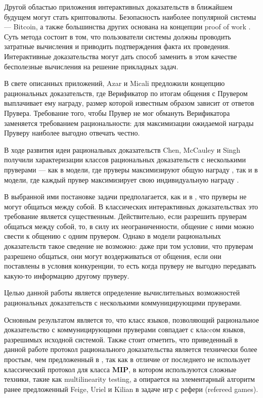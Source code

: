 \documentclass[14pt, a4paper]{extreport}
\begin{document}
Другой областью приложения интерактивных доказательств в ближайшем будущем могут стать криптовалюты. Безопасность наиболее популярной системы --- Bitcoin, а также большинства других основана на концепции proof of work \cite{nakamoto2008bitcoin}. Суть метода состоит в том, что пользователи системы должны проводить затратные вычисления и приводить подтверждения факта их проведения. Интерактивные доказательства могут дать способ заменить в этом качестве бесполезные вычисления на решение прикладных задач.

В свете описанных приложений, Azar и Micali \cite{azar2012rational} предложили концепцию рациональных доказательств, где Верификатор по итогам общения с Прувером выплачивает ему награду, размер которой известным образом зависит от ответов Прувера. Требование того, чтобы Прувер не мог обмануть Верификатора заменяется требованием рациональности: для максимизации ожидаемой награды Пруверу наиболее выгодно отвечать честно.

В ходе развития идеи рациональных доказательств Chen, McCauley и Singh получили характеризации классов рациональных доказательств с несколькими пруверами --- как в модели, где пруверы максимизируют общую награду \cite{chen2016mrip}, так и в модели, где каждый прувер максимизирует свою индивидуальную награду \cite{chen2017noncoop}.

В выбранной ими постановке задачи предполагается, как и в \cite{babai1991mip}, что пруверы не могут общаться между собой. В классических интерактивных доказательствах это требование является существенным. Действительно, если разрешить пруверам общаться между собой, то, в силу их неограниченности, общение с ними можно свести к общению с одним прувером. Однако в модели рациональных доказательств такое сведение не возможно: даже при том условии, что пруверам разрешено общаться, они могут воздерживаться от общения, если они поставлены в условия конкуренции, то есть когда пруверу не выгодно передавать какую-то информацию другому пруверу.

Целью данной работы является определение вычислительных возможностей рациональных доказательств с несколькими коммуницирующими пруверами.

Основным результатом является то, что класс языков, позволяющий рациональное доказательство с коммуницирующими пруверами совпадает с клаccом языков, разрешимых исходной системой. Также стоит отметить, что приведенный в данной работе протокол рационального доказательства является технически более простым, чем предложенный в \cite{chen2017noncoop}, так как в отличие от последнего не использует классический протокол для класса $\textbf{MIP}$, в котором используются сложные техники, такие как multilinearity testing, а опирается на элементарный алгоритм ранее предложенный Feige, Uriel и Kilian \cite{feige1997refereed} в задаче игр с рефери (refereed games).
\end{document}
